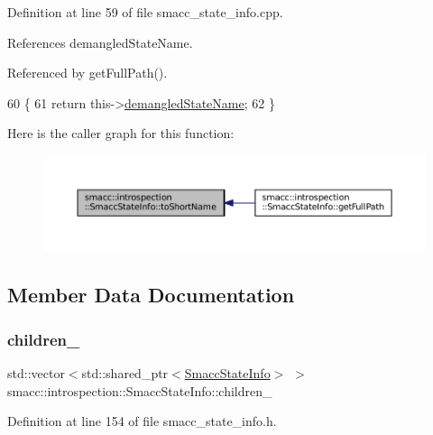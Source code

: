 Definition at line 59 of file smacc\+\_\+state\+\_\+info.\+cpp.



References demangled\+State\+Name.



Referenced by get\+Full\+Path().


\begin{DoxyCode}
60 \{
61     \textcolor{keywordflow}{return} this->\hyperlink{classsmacc_1_1introspection_1_1SmaccStateInfo_acf0014a819c23caad085ba6df13a17bf}{demangledStateName};
62 \}
\end{DoxyCode}
Here is the caller graph for this function\+:
\nopagebreak
\begin{figure}[H]
\begin{center}
\leavevmode
\includegraphics[width=350pt]{classsmacc_1_1introspection_1_1SmaccStateInfo_a39d7f8a587087b6abd0752058e2d8301_icgraph}
\end{center}
\end{figure}


\subsection{Member Data Documentation}
\mbox{\label{classsmacc_1_1introspection_1_1SmaccStateInfo_a73eac049e8149b6eaeec735101c32ef9}} 
\subsubsection{\texorpdfstring{children\+\_\+}{children\_}}
{\footnotesize\ttfamily std\+::vector$<$std\+::shared\+\_\+ptr$<$\hyperlink{classsmacc_1_1introspection_1_1SmaccStateInfo}{Smacc\+State\+Info}$>$ $>$ smacc\+::introspection\+::\+Smacc\+State\+Info\+::children\+\_\+}



Definition at line 154 of file smacc\+\_\+state\+\_\+info.\+h.



